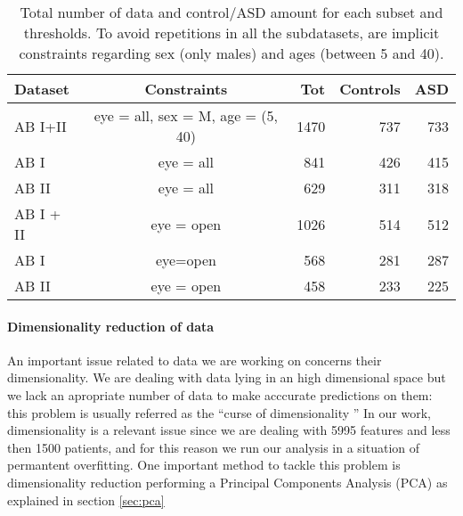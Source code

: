 \documentclass[11pt]{report}
\begin{document}
\begin{table}[!htp]\centering
\scriptsize
\begin{tabular}{lcrrr}\toprule
Dataset &Constraints &Tot &Controls &ASD \\\midrule
AB I+II &eye = all, sex = M, age = (5, 40) &1470 &737 &733 \\
AB I& eye = all&841 &426 &415 \\
AB II&eye = all &629 &311 &318 \\
AB I + II &eye = open &1026 &514 &512 \\
AB I& eye=open &568 &281 &287 \\
AB II &eye = open &458 &233 &225 \\
\bottomrule
\end{tabular}
\caption{Total number of data and control/ASD amount for each subset and thresholds. To avoid repetitions in all the subdatasets, are implicit constraints regarding sex (only males) and ages (between 5 and 40).}
\label{tab:controlASD_per_subset}
\end{table}


\paragraph{Dimensionality reduction of data} \hfill

An important issue related to data we are working on concerns their dimensionality.
We are dealing with data lying in an high dimensional space but we lack an apropriate number of data to make acccurate predictions on them: this problem is usually referred as the \textquotedblleft curse of dimensionality \textquotedblright
In our work, dimensionality is a relevant issue since we are dealing with 5995 features and less then 1500 patients, and for this reason we run our analysis in a situation of permantent overfitting.
One important method to tackle this problem is dimensionality reduction performing a Principal Components Analysis (PCA) as explained in section \ref{sec:pca}

\end{document}
